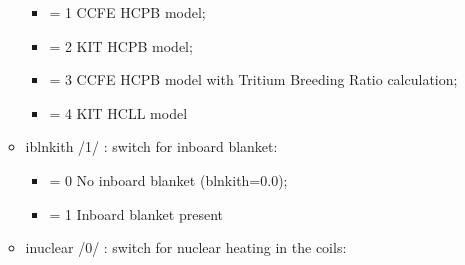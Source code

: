 \documentclass[]{article}
\providecommand{\tightlist}{%
  \setlength{\itemsep}{0pt}\setlength{\parskip}{0pt}}
\begin{document}
\begin{itemize}
\begin{itemize}
    \begin{itemize}
    \tightlist
    \item
      = 1 CCFE HCPB model;
    \item
      = 2 KIT HCPB model;
    \item
      = 3 CCFE HCPB model with Tritium Breeding Ratio calculation;
    \item
      = 4 KIT HCLL model
    \end{itemize}
  \item
    iblnkith /1/ : switch for inboard blanket:

    \begin{itemize}
    \tightlist
    \item
      = 0 No inboard blanket (blnkith=0.0);
    \item
      = 1 Inboard blanket present
    \end{itemize}
  \item
    inuclear /0/ : switch for nuclear heating in the coils:


\end{itemize}
\end{itemize}
\end{document}
